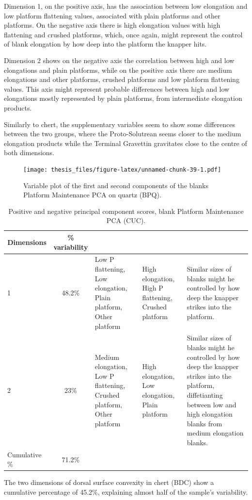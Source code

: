 \documentclass[12pt,twoside]{reedthesis}
\begin{document}
Dimension 1, on the positive axis, has the association between low elongation and low platform flattening values, associated with plain platforms and other platforms. On the negative axis there is high elongation values with high flattening and crushed platforms, which, once again, might represent the control of blank elongation by how deep into the platform the knapper hits.

Dimension 2 shows on the negative axis the correlation between high and low elongations and plain platforms, while on the positive axis there are medium elongations and other platforms, crushed platforms and low platform flattening values. This axis might represent probable differences between high and low elongations mostly represented by plain platforms, from intermediate elongation products.

Similarly to chert, the supplementary variables seem to show some differences between the two groups, where the Proto-Solutrean seems closer to the medium elongation products while the Terminal Gravettin gravitates close to the centre of both dimensions.
\begin{figure}
\centering
\texttt{[image: thesis\_files/figure-latex/unnamed-chunk-39-1.pdf]}
\caption{\label{fig:unnamed-chunk-39}Variable plot of the first and second components of the blanks Platform Maintenance PCA on quartz (BPQ).}
\end{figure}
\begin{table}

\caption{\label{tab:unnamed-chunk-40}Positive and negative principal component scores, blank Platform Maintenance PCA (CUC).}
\centering
\begin{tabular}[t]{lc>{\raggedright\arraybackslash}p{3cm}>{\raggedright\arraybackslash}p{3cm}>{\raggedright\arraybackslash}p{3cm}}
\toprule
\multicolumn{1}{c}{\textbf{Dimensions}} & \multicolumn{1}{c}{\textbf{\% variability}} & \multicolumn{1}{>{\centering\arraybackslash}p{3cm}}{\textbf{+}} & \multicolumn{1}{>{\centering\arraybackslash}p{3cm}}{\textbf{-}} & \multicolumn{1}{>{\centering\arraybackslash}p{3cm}}{\textbf{Interpretation}}\\
\midrule
1 & 48.2\% & Low P flattening, Low elongation, Plain platform, Other platform & High elongation, High P flattening, Crushed platform & Similar sizes of blanks might he controlled by how deep the knapper strikes into the platform.\\
2 & 23\% & Medium elongation, Low P flattening, Crushed platform, Other platform & High elongation, Low elongation, Plain platform & Similar sizes of blanks might he controlled by how deep the knapper strikes into the platform, diffetianting between low and high elongation blanks from medium elongation blanks.\\
Cumulative \% & 71.2\% &  &  & \\
\bottomrule
\end{tabular}
\end{table}
The two dimensions of dorsal surface convexity in chert (BDC) show a cumulative percentage of 45.2\%, explaining almost half of the sample's variability.
\end{document}
